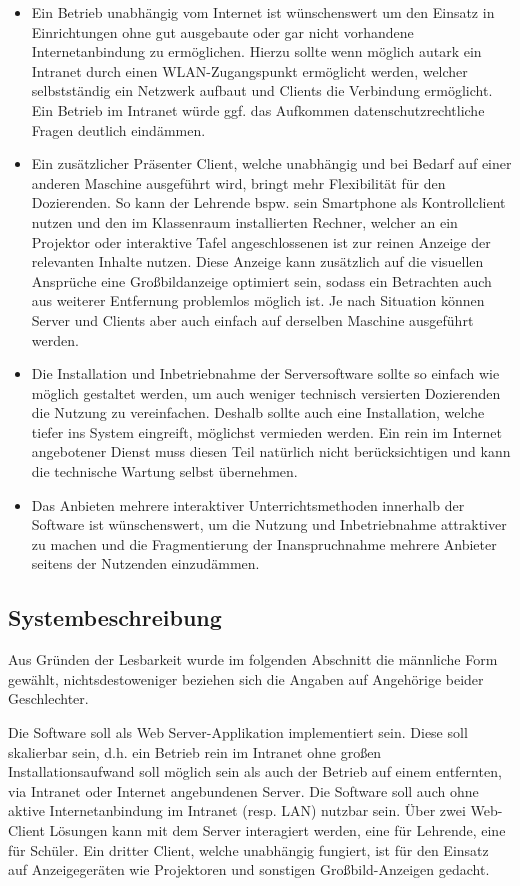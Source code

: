 \begin{itemize}
	\item Ein Betrieb unabhängig vom Internet ist wünschenswert um den Einsatz in Einrichtungen ohne gut ausgebaute oder gar nicht vorhandene Internetanbindung zu ermöglichen. Hierzu sollte wenn möglich autark ein Intranet durch einen WLAN-Zugangspunkt ermöglicht werden, welcher selbstständig ein Netzwerk aufbaut und Clients die Verbindung ermöglicht. Ein Betrieb im Intranet würde ggf. das Aufkommen datenschutzrechtliche Fragen deutlich eindämmen.
	\item Ein zusätzlicher Präsenter Client, welche unabhängig und bei Bedarf auf einer anderen Maschine ausgeführt wird, bringt mehr Flexibilität für den Dozierenden. So kann der Lehrende bspw. sein Smartphone als Kontrollclient nutzen und den im Klassenraum installierten Rechner, welcher an ein Projektor oder interaktive Tafel angeschlossenen ist zur reinen Anzeige der relevanten Inhalte nutzen. Diese Anzeige kann zusätzlich auf die visuellen Ansprüche eine Großbildanzeige optimiert sein, sodass ein Betrachten auch aus weiterer Entfernung problemlos möglich ist. Je nach Situation können Server und Clients aber auch einfach auf derselben Maschine ausgeführt werden. 
	\item Die Installation und Inbetriebnahme der Serversoftware sollte so einfach wie möglich gestaltet werden, um auch weniger technisch versierten Dozierenden die Nutzung zu vereinfachen. Deshalb sollte auch eine Installation, welche tiefer ins System eingreift, möglichst vermieden werden. Ein rein im Internet angebotener Dienst muss diesen Teil natürlich nicht berücksichtigen und kann die technische Wartung selbst übernehmen.
	\item Das Anbieten mehrere interaktiver Unterrichtsmethoden innerhalb der Software ist wünschenswert, um die Nutzung und Inbetriebnahme attraktiver zu machen und die Fragmentierung der Inanspruchnahme mehrere Anbieter seitens der Nutzenden einzudämmen. 
\end{itemize}

\subsection{Systembeschreibung}\label{sec:sysbeschreib}
Aus Gründen der Lesbarkeit wurde im folgenden Abschnitt die männliche Form gewählt, nichtsdestoweniger beziehen sich die Angaben auf Angehörige beider Geschlechter. 

Die Software soll als Web Server-Applikation implementiert sein. Diese soll skalierbar sein, d.h. ein Betrieb rein im Intranet ohne großen Installationsaufwand soll möglich sein als auch der Betrieb auf einem entfernten, via Intranet oder Internet angebundenen Server. Die Software soll auch ohne aktive Internetanbindung im Intranet (resp. LAN) nutzbar sein.
Über zwei Web-Client Lösungen kann mit dem Server interagiert werden, eine für Lehrende, eine für Schüler. Ein dritter Client, welche unabhängig fungiert, ist für den Einsatz auf Anzeigegeräten wie Projektoren und sonstigen Großbild-Anzeigen gedacht.  \\ \\

